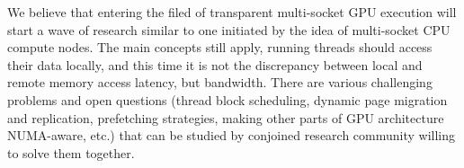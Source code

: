 \documentclass{sig-alternate}
\begin{document}
We believe that entering the filed of transparent multi-socket GPU execution will start a wave of research similar to one initiated by the idea of multi-socket CPU compute nodes. The main concepts still apply, running threads should access their data locally, and this time it is not the discrepancy between local and remote memory access latency, but bandwidth. There are various challenging problems and open questions (thread block scheduling, dynamic page migration and replication, prefetching strategies, making other parts of GPU architecture NUMA-aware, etc.) that can be studied by conjoined research community willing to solve them together.



\end{document}
